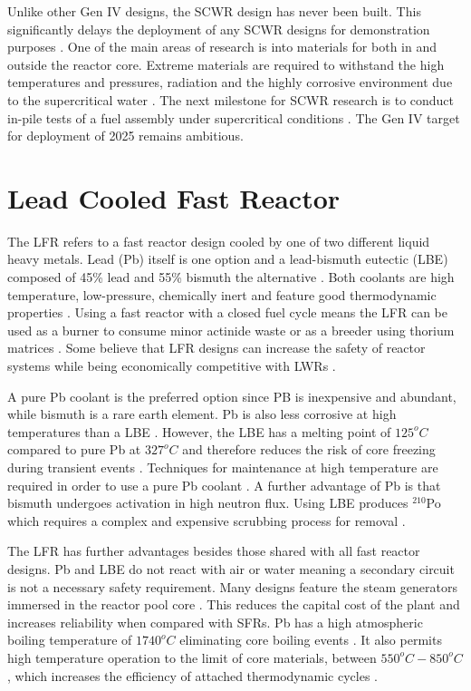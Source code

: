 \documentclass[journal]{IEEEtran}
\begin{document}
Unlike other Gen IV designs, the SCWR design has never been built.
This significantly delays the deployment of any SCWR designs for demonstration purposes \cite{GenIVForum}.
One of the main areas of research is into materials for both in and outside the reactor core.
Extreme materials are required to withstand the high temperatures and pressures, radiation and the highly corrosive environment due to the supercritical water \cite{GenIVForum}.
The next milestone for SCWR research is to conduct in-pile tests of a fuel assembly under supercritical conditions \cite{GenIVForum}.
The Gen IV target for deployment of 2025 remains ambitious.

\section{Lead Cooled Fast Reactor}
The LFR refers to a fast reactor design cooled by one of two different liquid heavy metals. 
Lead (Pb) itself is one option and a lead-bismuth eutectic (LBE) composed of 45\% lead and 55\% bismuth the alternative \cite{Int2012}.
Both coolants are high temperature, low-pressure, chemically inert and feature good thermodynamic properties \cite{GenIVForum}.
Using a fast reactor with a closed fuel cycle means the LFR can be used as a burner to consume minor actinide waste or as a breeder using thorium matrices \cite{GenIVForum}.
Some believe that LFR designs can increase the safety of reactor systems while being economically competitive with LWRs \cite{Int2012}.

A pure Pb coolant is the preferred option since PB is inexpensive and abundant, while bismuth is a rare earth element.
Pb is also less corrosive at high temperatures than a LBE \cite{Locatelli2013}.
However, the LBE has a melting point of $125^{o}C$ compared to pure Pb at $327^{o}C$ and therefore reduces the risk of core freezing during transient events \cite{Locatelli2013}.
Techniques for maintenance at high temperature are required in order to use a pure Pb coolant \cite{Int2012}.
A further advantage of Pb is that bismuth undergoes activation in high neutron flux.
Using LBE produces $^{210}$Po which requires a complex and expensive scrubbing process for removal \cite{Int2012}.

The LFR has further advantages besides those shared with all fast reactor designs.
Pb and LBE do not react with air or water meaning a secondary circuit is not a necessary safety requirement.
Many designs feature the steam generators immersed in the reactor pool core \cite{GenIVRoadmap}.
This reduces the capital cost of the plant and increases reliability when compared with SFRs.
Pb has a high atmospheric boiling temperature of $1740^ {o}C$ eliminating core boiling events \cite{Sakamoto2013194}.
It also permits high temperature operation to the limit of core materials, between $550^{o}C - 850^{o}C$, which increases the efficiency of attached thermodynamic cycles \cite{Marques2010a} .
\end{document}
